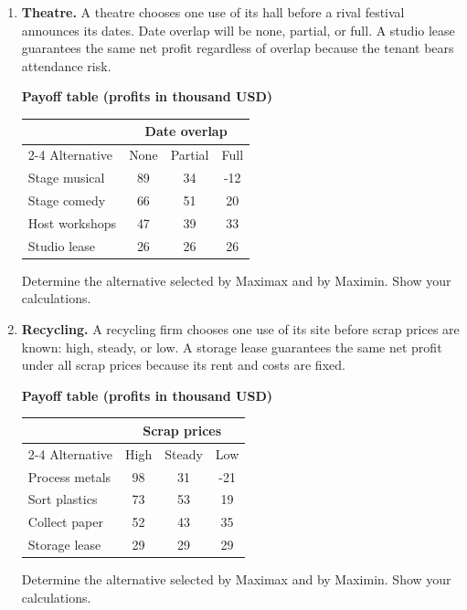 \begin{enumerate}[leftmargin=0.25in, itemsep=0pt, parsep=3pt]
Determine the alternative selected by Maximax and by Maximin. Show your calculations.
\par\vfill

\newpage

\item \textbf{Theatre.} A theatre chooses one use of its hall before a rival festival announces its dates. Date overlap will be none, partial, or full. A studio lease guarantees the same net profit regardless of overlap because the tenant bears attendance risk.

\begin{center}
\textbf{Payoff table (profits in thousand USD)}\\[3pt]
\begin{tabular}{lccc}
\toprule
& \multicolumn{3}{c}{Date overlap} \\
\cmidrule(lr){2-4}
Alternative & None & Partial & Full \\
\midrule
Stage musical & 89 & 34 & -12 \\
Stage comedy & 66 & 51 & 20 \\
Host workshops & 47 & 39 & 33 \\
Studio lease & 26 & 26 & 26 \\
\bottomrule
\end{tabular}
\end{center}

Determine the alternative selected by Maximax and by Maximin. Show your calculations.
\par\vfill

\item \textbf{Recycling.} A recycling firm chooses one use of its site before scrap prices are known: high, steady, or low. A storage lease guarantees the same net profit under all scrap prices because its rent and costs are fixed.

\begin{center}
\textbf{Payoff table (profits in thousand USD)}\\[3pt]
\begin{tabular}{lccc}
\toprule
& \multicolumn{3}{c}{Scrap prices} \\
\cmidrule(lr){2-4}
Alternative & High & Steady & Low \\
\midrule
Process metals & 98 & 31 & -21 \\
Sort plastics & 73 & 53 & 19 \\
Collect paper & 52 & 43 & 35 \\
Storage lease & 29 & 29 & 29 \\
\bottomrule
\end{tabular}
\end{center}

Determine the alternative selected by Maximax and by Maximin. Show your calculations.
\par\vfill

\end{enumerate}

